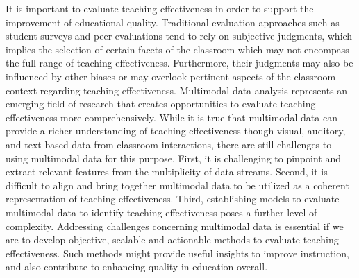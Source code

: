 It is important to evaluate teaching effectiveness in order to support the improvement of educational quality. Traditional evaluation approaches such as student surveys and peer evaluations tend to rely on subjective judgments, which implies the selection of certain facets of the classroom which may not encompass the full range of teaching effectiveness. Furthermore, their judgments may also be influenced by other biases or may overlook pertinent aspects of the classroom context regarding teaching effectiveness. Multimodal data analysis represents an emerging field of research that creates opportunities to evaluate teaching effectiveness more comprehensively. While it is true that multimodal data can provide a richer understanding of teaching effectiveness though visual, auditory, and text-based data from classroom interactions, there are still challenges to using multimodal data for this purpose. First, it is challenging to pinpoint and extract relevant features from the multiplicity of data streams. Second, it is difficult to align and bring together multimodal data to be utilized as a coherent representation of teaching effectiveness. Third, establishing models to evaluate multimodal data to identify teaching effectiveness poses a further level of complexity. Addressing challenges concerning multimodal data is essential if we are to develop objective, scalable and actionable methods to evaluate teaching effectiveness. Such methods might provide useful insights to improve instruction, and also contribute to enhancing quality in education overall.
